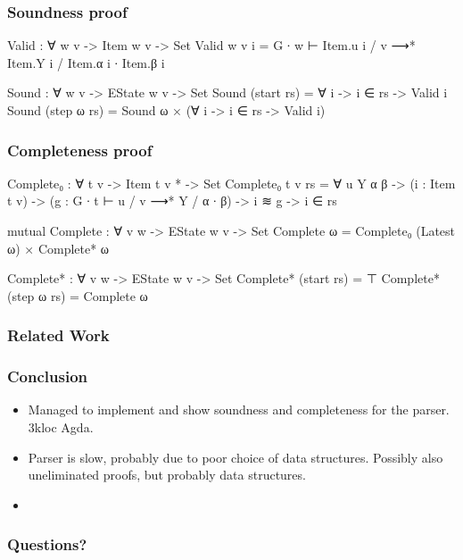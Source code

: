 \begin{frame}
	\frametitle{Soundness proof}
	\begin{code}
		  Valid : ∀ {w v} -> Item w v -> Set
		  Valid {w} {v} i =
		    G ∙ w ⊢ Item.u i / v ⟶* Item.Y i / Item.α i ∙ Item.β i

		  Sound : ∀ {w v} -> EState w v -> Set
		  Sound (start rs) = ∀ {i} -> i ∈ rs -> Valid i
		  Sound (step ω rs) = Sound ω × (∀ {i} -> i ∈ rs -> Valid i)
  	\end{code}
\end{frame}

\begin{frame}
	\frametitle{Completeness proof}
	\begin{code}
		  Complete₀ : ∀ {t v} -> Item t v * -> Set
		  Complete₀ {t} {v} rs = ∀ {u Y α β} ->
		    (i : Item t v) ->
		    (g : G ∙ t ⊢ u / v ⟶* Y / α ∙ β) ->
		    i ≋ g ->
		    i ∈ rs

		  mutual
		    Complete : ∀ {v w} -> EState w v -> Set
		    Complete ω = Complete₀ (Latest ω) × Complete* ω

		    Complete* : ∀ {v w} -> EState w v -> Set
		    Complete* (start rs) = ⊤
		    Complete* (step ω rs) = Complete ω
	\end{code}
\end{frame}

\begin{frame}
	\frametitle{Related Work}

\end{frame}

\begin{frame}
	\frametitle{Conclusion}
	\begin{itemize}

		\item

			Managed to implement and show soundness and completeness for the
			parser. 3kloc Agda.

		\item

			Parser is slow, probably due to poor choice of data structures.
			Possibly also uneliminated proofs, but probably data structures.

		\item



	\end{itemize}
\end{frame}

\begin{frame}
	\frametitle{Questions?}
\end{frame}
